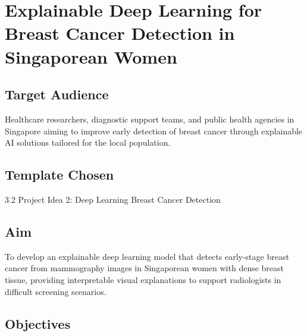 \documentclass[12pt]{article}
\begin{document}
\section{Explainable Deep Learning for Breast Cancer Detection in Singaporean Women}

\subsection*{Target Audience}
Healthcare researchers, diagnostic support teams, and public health agencies in Singapore aiming to improve early detection of breast cancer through explainable AI solutions tailored for the local population.

\subsection*{Template Chosen}
3.2 Project Idea 2: Deep Learning Breast Cancer Detection

\subsection*{Aim}
To develop an explainable deep learning model that detects early-stage breast cancer from mammography images in Singaporean women with dense breast tissue, providing interpretable visual explanations to support radiologists in difficult screening scenarios.

\subsection*{Objectives}
\end{document}
